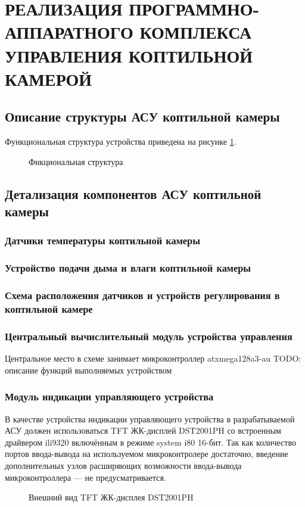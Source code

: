 \section{РЕАЛИЗАЦИЯ ПРОГРАММНО-АППАРАТНОГО КОМПЛЕКСА УПРАВЛЕНИЯ КОПТИЛЬНОЙ КАМЕРОЙ}

\subsection{Описание структуры АСУ коптильной камеры}

Функциональная структура устройства приведена на рисунке \ref{img:funcd}.
\begin{figure}[h]
	\caption{Фнкциональная структура}
	\label{img:funcd}
\end{figure}


\subsection{Детализация компонентов АСУ коптильной камеры}

\subsubsection{Датчики температуры коптильной камеры}

\subsubsection{Устройство подачи дыма и влаги коптильной камеры}

\subsubsection{Схема расположения датчиков и устройств регулирования в коптильной камере}

\subsubsection{Центральный вычислительный модуль устройства управления}
Центральное место в схеме занимает микроконтроллер atxmega128a3-au
TODO: описание функций выполняемых устройством

\subsubsection{Модуль индикации управляющего устройства}
\begin{par}
В качестве устройства индикации управляющего устройства в разрабатываемой АСУ должен использоваться TFT
ЖК-дисплей DST2001PH\cite{display} со встроенным драйвером ili9320 включённым в режиме system
i80 16-бит\cite{ili9320}.
Так как количество портов ввода-вывода на используемом микроконтролере достаточно, введение дополнительных узлов
расширяющих возможности ввода-вывода микроконтроллера --- не предусматривается.
\begin{figure}[h]
	\caption{Внешний вид TFT ЖК-дисплея DST2001PH}
	\label{img:iili9320}
\end{figure}
\end{par}

